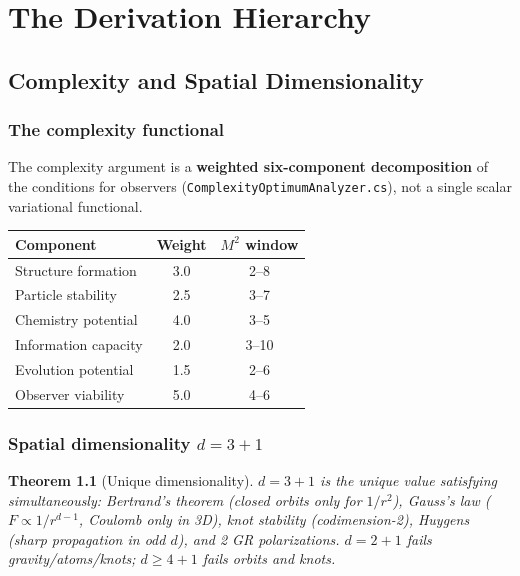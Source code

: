 \documentclass[11pt,twoside]{book}
\newtheorem{theorem}{Theorem}[chapter]
\begin{document}
\part{The Derivation Hierarchy}

\chapter{Complexity and Spatial Dimensionality}
\label{ch:complexity}

\section{The complexity functional}

The complexity argument is a \textbf{weighted six-component decomposition} of the
conditions for observers (\texttt{ComplexityOptimumAnalyzer.cs}), not a single scalar
variational functional.

\begin{center}
\begin{tabular}{lcc}
\toprule
Component & Weight & $M^2$ window \\
\midrule
Structure formation & 3.0 & 2--8 \\
Particle stability & 2.5 & 3--7 \\
Chemistry potential & 4.0 & 3--5 \\
Information capacity & 2.0 & 3--10 \\
Evolution potential & 1.5 & 2--6 \\
Observer viability & 5.0 & 4--6 \\
\bottomrule
\end{tabular}
\end{center}

\section{Spatial dimensionality $d=3+1$}

\begin{theorem}[Unique dimensionality]
$d=3+1$ is the \emph{unique} value satisfying simultaneously: Bertrand's theorem (closed
orbits only for $1/r^2$), Gauss's law ($F\propto1/r^{d-1}$, Coulomb only in 3D), knot
stability (codimension-2), Huygens (sharp propagation in odd $d$), and 2 GR polarizations.
$d=2+1$ fails gravity/atoms/knots; $d\ge4+1$ fails orbits and knots.
\end{theorem}
\end{document}
